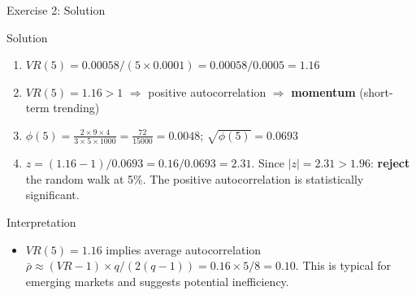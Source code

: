 \documentclass[9pt, aspectratio=169, t]{beamer}
\theoremstyle{definition}
\newenvironment{cminipage}[1]{%
    \par\noindent\hfill\begin{minipage}{#1}\ignorespaces
}{%
    \end{minipage}\hfill\null\par
}
\begin{document}
\begin{frame}{Exercise 2: Solution}
\begin{cminipage}{0.95\textwidth}
\begin{block}{Solution}
\begin{enumerate}
\item $VR(5) = 0.00058 / (5 \times 0.0001) = 0.00058 / 0.0005 = 1.16$
\item $VR(5) = 1.16 > 1$ $\Rightarrow$ positive autocorrelation $\Rightarrow$ \textbf{momentum} (short-term trending)
\item $\phi(5) = \frac{2 \times 9 \times 4}{3 \times 5 \times 1000} = \frac{72}{15000} = 0.0048$; \quad $\sqrt{\phi(5)} = 0.0693$
\item $z = (1.16 - 1)/0.0693 = 0.16/0.0693 = 2.31$. Since $|z| = 2.31 > 1.96$: \textbf{reject} the random walk at 5\%. The positive autocorrelation is statistically significant.
\end{enumerate}
\end{block}
\vspace{0.1cm}
\begin{alertblock}{Interpretation}
\begin{itemize}\setlength{\itemsep}{0pt}
    \item $VR(5) = 1.16$ implies average autocorrelation $\bar{\rho} \approx (VR - 1) \times q/(2(q-1)) = 0.16 \times 5/8 = 0.10$. This is typical for emerging markets and suggests potential inefficiency.
\end{itemize}
\end{alertblock}
\end{cminipage}
\end{frame}
\end{document}
